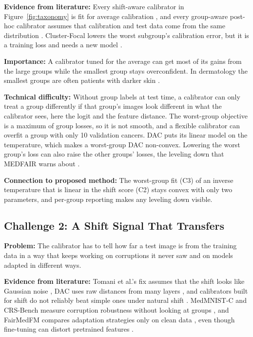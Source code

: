 \documentclass[sigconf,nonacm]{acmart}
\begin{document}
\textbf{Evidence from literature:} Every shift-aware calibrator in Figure~\ref{fig:taxonomy} is fit for average calibration \cite{tomani2021posthoc,yu2022multidomain,tomani2023dac,kim2024energy}, and every group-aware post-hoc calibrator assumes that calibration and test data come from the same distribution \cite{hebertjohnson2018multicalibration,salvador2022faircal,shen2025calin}. Cluster-Focal lowers the worst subgroup's calibration error, but it is a training loss and needs a new model \cite{shui2023clusterfocal}.

\textbf{Importance:} A calibrator tuned for the average can get most of its gains from the large groups while the smallest group stays overconfident. In dermatology the smallest groups are often patients with darker skin \cite{groh2021fitzpatrick}.

\textbf{Technical difficulty:} Without group labels at test time, a calibrator can only treat a group differently if that group's images look different in what the calibrator sees, here the logit and the feature distance. The worst-group objective is a maximum of group losses, so it is not smooth, and a flexible calibrator can overfit a group with only 10 validation cancers. DAC puts its linear model on the temperature, which makes a worst-group DAC non-convex. Lowering the worst group's loss can also raise the other groups' losses, the leveling down that MEDFAIR warns about \cite{zong2023medfair}.

\textbf{Connection to proposed method:} The worst-group fit (C3) of an inverse temperature that is linear in the shift score (C2) stays convex with only two parameters, and per-group reporting makes any leveling down visible.

\subsection{Challenge 2: A Shift Signal That Transfers}
\label{sec:ch2}

\textbf{Problem:} The calibrator has to tell how far a test image is from the training data in a way that keeps working on corruptions it never saw and on models adapted in different ways.

\textbf{Evidence from literature:} Tomani et al.'s fix assumes that the shift looks like Gaussian noise \cite{tomani2021posthoc}, DAC uses raw distances from many layers \cite{tomani2023dac}, and calibrators built for shift do not reliably beat simple ones under natural shift \cite{roschewitz2025where}. MedMNIST-C and CRS-Bench measure corruption robustness without looking at groups \cite{disalvo2024medmnistc,lin2026crsbench}, and FairMedFM compares adaptation strategies only on clean data \cite{jin2024fairmedfm}, even though fine-tuning can distort pretrained features \cite{kumar2022finetuning}.
\end{document}
